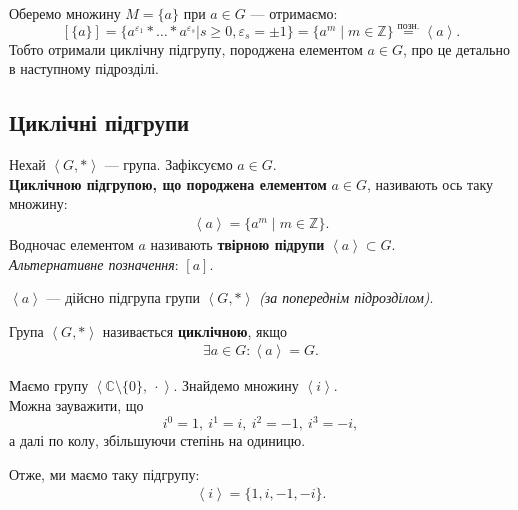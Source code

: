 \documentclass{math_library}
\begin{document}
\begin{example}
Оберемо множину $M = \{a\}$ при $a \in G$ --- отримаємо:
\[
[\{a\}] = \{ a^{\varepsilon_1}* \dots * a^{\varepsilon_s} | s \geq 0, \varepsilon_s = \pm 1 \} = \{ a^m \mid m \in \mathbb{Z} \} \overset{\text{позн.}}{=} \left<a\right>.
\]
Тобто отримали циклічну підгрупу, породжена елементом $a \in G$, про це детально в наступному підрозділі.
\end{example}

\subsection{Циклічні підгрупи}
\begin{definition}
Нехай $\left<G,* \right>$ --- група. Зафіксуємо $a \in G$.\\
\textbf{Циклічною підгрупою, що породжена елементом} $a \in G$, називають ось таку множину:
\begin{align*}
\left<a\right> = \{ a^m \mid m \in \mathbb{Z} \}.
\end{align*}
Водночас елементом $a$ називають \textbf{твірною підрупи} $\left<a\right> \subset G$.\\
\textit{Альтернативне позначення}: $\left[ a \right]$.
\end{definition}

\begin{remark}
$\left<a\right>$ --- дійсно підгрупа групи $\left<G,* \right>$ \textit{(за попереднім підрозділом)}.
\end{remark}

\begin{definition}
Група $\left<G,*\right>$ називається \textbf{циклічною}, якщо
\begin{align*}
\exists a \in G: \left<a\right> = G.
\end{align*}
\end{definition}

\begin{example}
Маємо групу $\left<\mathbb{C} \setminus \{0\},\ \cdot \right>$. Знайдемо множину $\left<i\right>$.
\bigskip \\
Можна зауважити, що \[
i^0 = 1,\ i^1 = i,\ i^2 = -1,\ i^3 = -i,
\]
а далі по колу, збільшуючи степінь на одиницю.
\begin{figure}[H]
\centering
{}
\end{figure}
Отже, ми маємо таку підгрупу:
\begin{align*}
\left<i\right> = \{1,i,-1,-i\}.
\end{align*}
\end{example}
\end{document}
